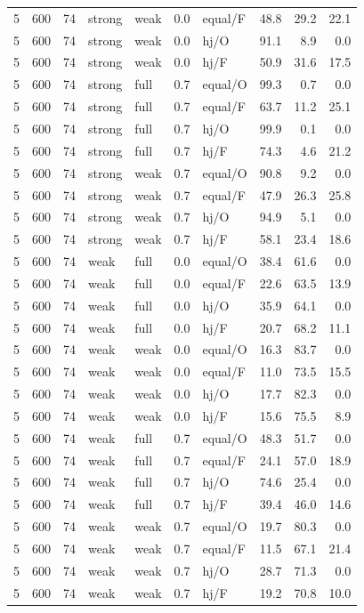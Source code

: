 {\begin{longtable}{@{}rrrllllrrr@{}}
5 & 600 & 74 & strong & weak & 0.0 & equal/F & 48.8 & 29.2 & 22.1\\
5 & 600 & 74 & strong & weak & 0.0 & hj/O & 91.1 & 8.9 & 0.0\\
5 & 600 & 74 & strong & weak & 0.0 & hj/F & 50.9 & 31.6 & 17.5\\
5 & 600 & 74 & strong & full & 0.7 & equal/O & 99.3 & 0.7 & 0.0\\
5 & 600 & 74 & strong & full & 0.7 & equal/F & 63.7 & 11.2 & 25.1\\
5 & 600 & 74 & strong & full & 0.7 & hj/O & 99.9 & 0.1 & 0.0\\
5 & 600 & 74 & strong & full & 0.7 & hj/F & 74.3 & 4.6 & 21.2\\
5 & 600 & 74 & strong & weak & 0.7 & equal/O & 90.8 & 9.2 & 0.0\\
5 & 600 & 74 & strong & weak & 0.7 & equal/F & 47.9 & 26.3 & 25.8\\
5 & 600 & 74 & strong & weak & 0.7 & hj/O & 94.9 & 5.1 & 0.0\\
5 & 600 & 74 & strong & weak & 0.7 & hj/F & 58.1 & 23.4 & 18.6\\
5 & 600 & 74 & weak & full & 0.0 & equal/O & 38.4 & 61.6 & 0.0\\
5 & 600 & 74 & weak & full & 0.0 & equal/F & 22.6 & 63.5 & 13.9\\
5 & 600 & 74 & weak & full & 0.0 & hj/O & 35.9 & 64.1 & 0.0\\
5 & 600 & 74 & weak & full & 0.0 & hj/F & 20.7 & 68.2 & 11.1\\
5 & 600 & 74 & weak & weak & 0.0 & equal/O & 16.3 & 83.7 & 0.0\\
5 & 600 & 74 & weak & weak & 0.0 & equal/F & 11.0 & 73.5 & 15.5\\
5 & 600 & 74 & weak & weak & 0.0 & hj/O & 17.7 & 82.3 & 0.0\\
5 & 600 & 74 & weak & weak & 0.0 & hj/F & 15.6 & 75.5 & 8.9\\
5 & 600 & 74 & weak & full & 0.7 & equal/O & 48.3 & 51.7 & 0.0\\
5 & 600 & 74 & weak & full & 0.7 & equal/F & 24.1 & 57.0 & 18.9\\
5 & 600 & 74 & weak & full & 0.7 & hj/O & 74.6 & 25.4 & 0.0\\
5 & 600 & 74 & weak & full & 0.7 & hj/F & 39.4 & 46.0 & 14.6\\
5 & 600 & 74 & weak & weak & 0.7 & equal/O & 19.7 & 80.3 & 0.0\\
5 & 600 & 74 & weak & weak & 0.7 & equal/F & 11.5 & 67.1 & 21.4\\
5 & 600 & 74 & weak & weak & 0.7 & hj/O & 28.7 & 71.3 & 0.0\\
5 & 600 & 74 & weak & weak & 0.7 & hj/F & 19.2 & 70.8 & 10.0\\
\end{longtable}
}
